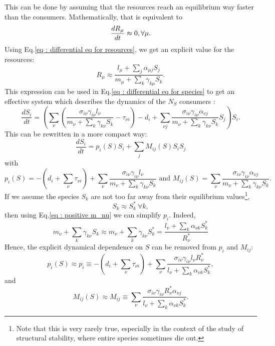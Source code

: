 \documentclass[12pt, titlepage]{report}
\begin{document}
This can be done by assuming that the resources reach an equilibrium way faster than the consumers.
Mathematically, that is equivalent to
\begin{equation}
  \frac{dR_\mu}{dt} \approx 0, \\ \forall \mu.
\end{equation}
Using Eq.\eqref{eq : differential eq for resources}, we get an explicit value for the resources:
\begin{equation}
  R_\mu \approx \frac{l_\mu+\sum_j \alpha_{\mu j}S_j}{m_\mu + \sum_k \gamma_{k\mu}S_k}.
\end{equation}
This expression can be used in Eq.\eqref{eq : differential eq for species} to get an effective system which describes the dynamics of the $N_S$ consumers :
\begin{equation}
  \frac{dS_i}{dt} = \left(\sum_\nu \left(\frac{\sigma_{i\nu}\gamma_{i\nu}l_\nu}{m_\nu+\sum_k \gamma_{k\nu}S_k} - \tau_{\nu i}\right) -d_i + \sum_{\nu j} \frac{\sigma_{i\nu}\gamma_{i\nu}\alpha_{\nu j}}{m_\nu+\sum_{k}\gamma_{k\nu}S_k}S_j \right) S_i.
\end{equation}
This can be rewritten in a more compact way:
\begin{equation}
  \frac{dS_i}{dt} = p_i(S) S_i + \sum_j M_{ij}(S)S_i S_j \label{eq : effective equations of evolution}
\end{equation}
with
\begin{equation}
    p_i(S) = -\left(d_i+\sum_{\nu}\tau_{\nu i}\right) + \sum_\nu \frac{\sigma_{i\nu}\gamma_{i\nu}l_\nu}{m_\nu+\sum_k \gamma_{k\nu}S_k}\text{ and } M_{ij}(S)=\sum_{\nu}\frac{\sigma_{i\nu}\gamma_{i\nu}\alpha_{\nu j}}{m_\nu+\sum_{k}\gamma_{k\nu}S_k}.
\end{equation}
If we assume the species $S_k$ are not too far away from their equilibrium values\footnote{Note that this is very rarely true, especially in the context of the study of structural stability, where entire species sometimes die out.}, \ie
\begin{equation}
S_k \approx S^*_k \ \forall k,
\end{equation}
then using Eq.\eqref{eq : positive m_nu} we can simplify $p_i$. Indeed,
\begin{equation}
m_\nu + \sum_k \gamma_{k\nu} S_k \approx m_\nu + \sum_k \gamma_{k\nu}S^*_k = \frac{l_\nu + \sum_k \alpha_{\nu k}S^*_k}{R^*_\nu} \label{eq : equality fluxes resource}
\end{equation}
Hence, the explicit dynamical dependence on $S$ can be removed from $p_i$ and $M_{ij}$:
\begin{equation}
p_i(S) \approx p_i \equiv - \left(d_i + \sum_\nu \tau_{\nu i}\right) + \sum_\nu \frac{\sigma_{i\nu}\gamma_{i\nu}l_\nu R^*_\nu}{l_\nu + \sum_k \alpha_{\nu k}S^*_k},
\end{equation} and
\begin{equation}
M_{ij}(S) \approx M_{ij} \equiv \sum_\nu \frac{\sigma_{i\nu} \gamma_{i\nu} R^*_\nu \alpha_{\nu j}}{l_\nu + \sum_k{\alpha_{\nu k} S^*_k}}.
\end{equation}
\end{document}

